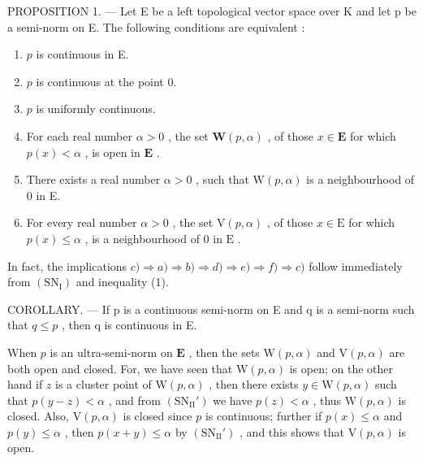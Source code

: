 PROPOSITION 1. --- Let E be a left topological vector space over K and let p be a semi-norm on E. The following conditions are equivalent :

\begin{enumerate}
\def\labelenumi{\alph{enumi})}
\item
  \(p\) is continuous in E.
\item
  \(p\) is continuous at the point 0.
\item
  \(p\) is uniformly continuous.
\item
  For each real number \(\alpha > 0\) , the set \(\mathbf{W}(p, \alpha)\) , of those \(x \in \mathbf{E}\) for which \(p(x) < \alpha\) , is open in \(\mathbf{E}\) .
\item
  There exists a real number \(\alpha > 0\) , such that \(\mathrm{W}(p, \alpha)\) is a neighbourhood of 0 in E.
\item
  For every real number \(\alpha > 0\) , the set \(\mathrm{V}(p, \alpha)\) , of those \(x \in \mathrm{E}\) for which \(p(x) \leqslant \alpha\) , is a neighbourhood of 0 in \(\mathrm{E}\) .
\end{enumerate}

In fact, the implications \(c) \Rightarrow a) \Rightarrow b) \Rightarrow d) \Rightarrow e) \Rightarrow f) \Rightarrow c)\) follow immediately from \((\mathrm{SN}_{\mathrm{I}})\) and inequality (1).

COROLLARY. --- If p is a continuous semi-norm on E and q is a semi-norm such that \(q \leqslant p\) , then q is continuous in E.

When \(p\) is an ultra-semi-norm on \(\mathbf{E}\) , then the sets \(\mathrm{W}(p, \alpha)\) and \(\mathrm{V}(p, \alpha)\) are both open and closed. For, we have seen that \(\mathrm{W}(p, \alpha)\) is open; on the other hand if \(z\) is a cluster point of \(\mathrm{W}(p, \alpha)\) , then there exists \(y \in \mathrm{W}(p, \alpha)\) such that \(p(y - z) < \alpha\) , and from \((\mathrm{SN}_{\mathrm{II}}')\) we have \(p(z) < \alpha\) , thus \(\mathrm{W}(p, \alpha)\) is closed. Also, \(\mathrm{V}(p, \alpha)\) is closed since \(p\) is continuous; further if \(p(x) \leqslant \alpha\) and \(p(y) \leqslant \alpha\) , then \(p(x + y) \leqslant \alpha\) by \((\mathrm{SN}_{\mathrm{II}}')\) , and this shows that \(\mathrm{V}(p, \alpha)\) is open.

